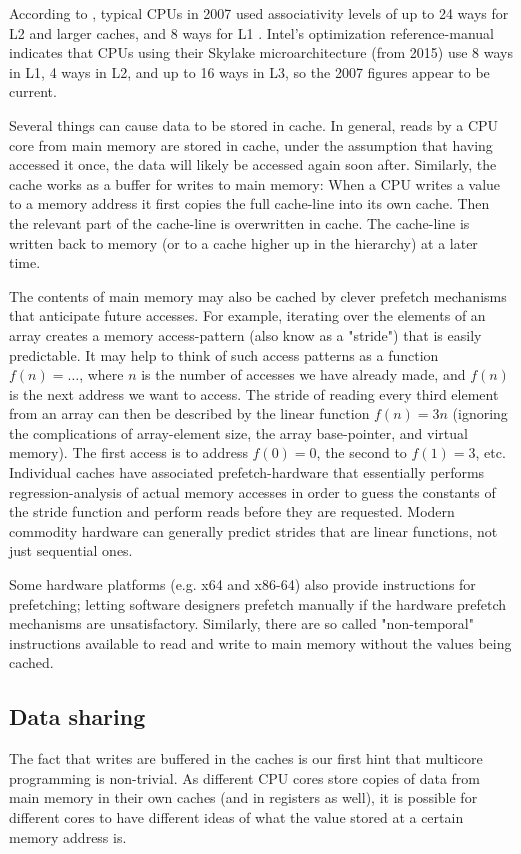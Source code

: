 According to \citeauthor{whatprogrammersshouldknow}, typical
CPUs in 2007 used associativity levels of up to 24 ways for L2 and larger
caches, and 8 ways for L1 \cite{whatprogrammersshouldknow}. Intel's
optimization reference-manual \cite{inteloptimize} indicates that CPUs using their
Skylake microarchitecture (from 2015) use 8 ways in L1, 4 ways in L2, and up to
16 ways in L3, so the 2007 figures appear to be current.

Several things can cause data to be stored in cache. In general, reads by
a CPU core from main memory are stored in cache, under the
assumption that having accessed it once, the data will likely be accessed again
soon after. Similarly, the cache works as a buffer for writes to main memory:
When a CPU writes a value to a memory address it first copies the full
cache-line into its own cache. Then the relevant part of the cache-line is
overwritten in cache. The cache-line is written back to memory (or to a
cache higher up in the hierarchy) at a later time.

The contents of main memory may also be cached by clever prefetch mechanisms that
anticipate future accesses. For example, iterating over the elements of an array
creates a memory access-pattern (also know as a "stride") that is easily
predictable. It may help to think of such access patterns as a function $f(n) =
\ldots$, where $n$ is the number of accesses we have already made, and $f(n)$ is
the next address we want to access. The stride of reading every third element
from an array can then be described by the linear function $f(n) = 3n$ (ignoring
the complications of array-element size, the array base-pointer, and virtual
memory).
The first access is to address $f(0) = 0$, the second to $f(1) = 3$, etc.
Individual caches have associated prefetch-hardware that essentially performs
regression-analysis of actual memory accesses in order to guess the constants of
the stride function and perform reads before they are requested. Modern
commodity hardware can generally predict strides that are linear functions, not
just sequential ones.

Some hardware platforms (e.g. x64 and x86-64) also provide instructions for
prefetching; letting software designers prefetch manually if the hardware
prefetch mechanisms are unsatisfactory\cite{whatprogrammersshouldknow}.
Similarly, there are so called "non-temporal" instructions available to read and
write to main memory without the values being cached.

\subsection{Data sharing}
The fact that writes are buffered in the caches is our first hint that
multicore programming is non-trivial. As different CPU cores store copies
of data from main memory in their own caches (and in registers as well), it is
possible for different cores to have different ideas of what the value stored at
a certain memory address is.

